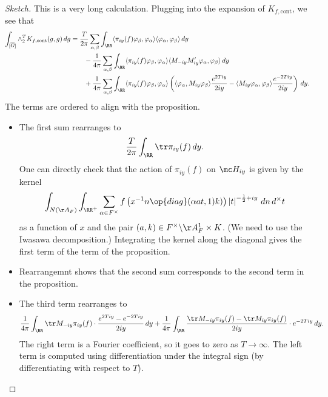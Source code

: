 \documentclass{article}
\begin{document}
\begin{proof}[Sketch]
	This is a very long calculation. Plugging into the expansion of $K_{f,\mathrm{cont}}$, we see that
	\begin{align*}
		\int_{[\overline G]}\land_2^TK_{f,\mathrm{cont}}(g,g)\,dg &= \frac T{2\pi}\sum_{\alpha,\beta}\int_\RR\langle\pi_{iy}(f)\varphi_\beta,\varphi_\alpha\rangle\langle\varphi_\alpha,\varphi_\beta\rangle\,dy \\
		&\qquad-\frac1{4\pi}\sum_{\alpha,\beta}\int_\RR\langle\pi_{iy}(f)\varphi_\beta,\varphi_\alpha\rangle\langle M_{-iy}M'_{iy}\varphi_\alpha,\varphi_\beta\rangle\,dy \\
		&\qquad+\frac1{4\pi}\sum_{\alpha,\beta}\int_\RR\langle\pi_{iy}(f)\varphi_\beta,\varphi_\alpha\rangle\left(\langle\varphi_\alpha,M_{iy}\varphi_\beta\rangle\frac{e^{2Tiy}}{2iy}-\langle M_{iy}\varphi_\alpha,\varphi_\beta\rangle\frac{e^{-2Tiy}}{2iy}\right)\,dy.
	\end{align*}
	The terms are ordered to align with the proposition.
	\begin{itemize}
		\item The first sum rearranges to
		\[\frac T{2\pi}\int_\RR\tr\pi_{iy}(f)\,dy.\]
		One can directly check that the action of $\pi_{iy}(f)$ on $\mc H_{iy}$ is given by the kernel
		\[\int_{N(\AA_F)}\int_{\RR^+}\sum_{\alpha\in F^\times}f\left(x^{-1}n\op{diag}(\alpha at,1)k)\right)\left|t\right|^{-\frac12+iy}\,dn\,d^\times t\]
		as a function of $x$ and the pair $(a,k)\in F^\times\backslash\AA_F^1\times K$. (We need to use the Iwasawa decomposition.) Integrating the kernel along the diagonal gives the first term of the term of the proposition.
		\item Rearrangemnt shows that the second sum corresponds to the second term in the proposition.
		\item The third term rearranges to
		\[\frac1{4\pi}\int_\RR\tr M_{-iy}\pi_{iy}(f)\cdot\frac{e^{2Tiy}-e^{-2Tiy}}{2iy}\,dy+\frac1{4\pi}\int_\RR\frac{\tr M_{-iy}\pi_{iy}(f)-\tr M_{iy}\pi_{iy}(f)}{2iy}\cdot e^{-2Tiy}\,dy.\]
		The right term is a Fourier coefficient, so it goes to zero as $T\to\infty$. The left term is computed using differentiation under the integral sign (by differentiating with respect to $T$).
		\qedhere
	\end{itemize}
\end{proof}
\end{document}
